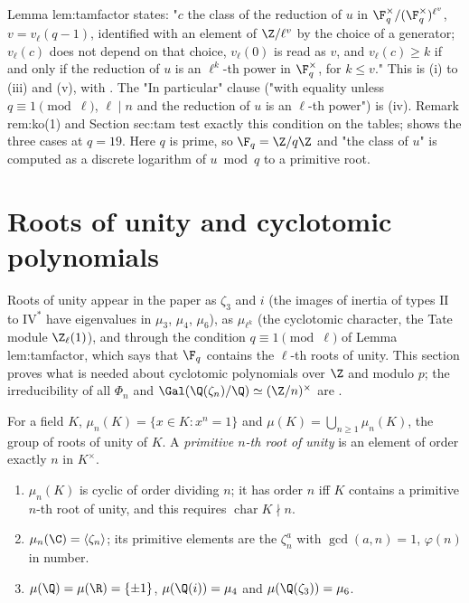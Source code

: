 \begin{paperlink}\label{pl:rings:tamfactor}
Lemma lem:tamfactor states: "$c$ the class of the reduction of $u$ in $\F_q^\times/(\F_q^\times)^{\ell^v}$, $v=v_\ell(q-1)$, identified with an element of
$\Z/\ell^v$ by the choice of a generator; $v_\ell(c)$ does not depend on that choice, $v_\ell(0)$ is read as $v$, and $v_\ell(c)\ge k$ if and only if
the reduction of $u$ is an $\ell^k$-th power in $\F_q^\times$, for $k\le v$." This is (i) to (iii) and (v), with .
The "In particular" clause ("with equality unless $q\equiv1\pmod\ell$, $\ell\mid n$ and the reduction of $u$ is an $\ell$-th power") is (iv). Remark
rem:ko(1) and Section sec:tam test exactly this condition on the tables;  shows the three cases at $q=19$.
Here $q$ is prime, so $\F_q=\Z/q\Z$ and "the class of $u$" is computed as a discrete logarithm of $u\bmod q$ to a primitive root.
\end{paperlink}

\section{Roots of unity and cyclotomic polynomials}\label{sec:rings:cyclotomic}

Roots of unity appear in the paper as $\zeta_3$ and $i$ (the images of inertia of types $\mathrm{II}$ to $\mathrm{IV}^*$ have eigenvalues in $\mu_3$, $\mu_4$,
$\mu_6$), as $\mu_{\ell^k}$ (the cyclotomic character, the Tate module $\Z_\ell(1)$), and through the condition $q\equiv1\pmod\ell$ of Lemma
lem:tamfactor, which says that $\F_q$ contains the $\ell$-th roots of unity. This section proves what is needed about cyclotomic
polynomials over $\Z$ and modulo $p$; the irreducibility of all $\Phi_n$ and $\Gal(\Q(\zeta_n)/\Q)\simeq(\Z/n)^\times$ are .

\begin{definition}\label{def:rings:roots-of-unity}
For a field $K$, $\mu_n(K)=\{x\in K:x^n=1\}$ and $\mu(K)=\bigcup_{n\ge1}\mu_n(K)$, the group of roots of unity of $K$. A \emph{primitive $n$-th root of
unity} is an element of order exactly $n$ in $K^\times$.
\end{definition}

\begin{proposition}\label{prop:rings:roots-of-unity}
\begin{enumerate}[label=(\roman*)]
\item $\mu_n(K)$ is cyclic of order dividing $n$; it has order $n$ iff $K$ contains a primitive $n$-th root of unity, and this requires
$\operatorname{char}K\nmid n$.
\item $\mu_n(\C)=\langle\zeta_n\rangle$; its primitive elements are the $\zeta_n^a$ with $\gcd(a,n)=1$, $\varphi(n)$ in number.
\item $\mu(\Q)=\mu(\R)=\{\pm1\}$, $\mu(\Q(i))=\mu_4$ and $\mu(\Q(\zeta_3))=\mu_6$.
\end{enumerate}
\end{proposition}

